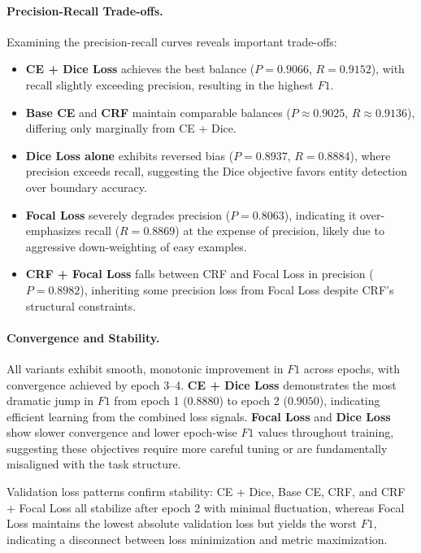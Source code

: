 \paragraph{Precision-Recall Trade-offs.}
Examining the precision-recall curves reveals important trade-offs:

\begin{itemize}
\item \textbf{CE + Dice Loss} achieves the best balance ($P = 0.9066$, $R = 0.9152$), with recall slightly exceeding precision, resulting in the highest $F1$.
\item \textbf{Base CE} and \textbf{CRF} maintain comparable balances ($P \approx 0.9025$, $R \approx 0.9136$), differing only marginally from CE + Dice.
\item \textbf{Dice Loss alone} exhibits reversed bias ($P = 0.8937$, $R = 0.8884$), where precision exceeds recall, suggesting the Dice objective favors entity detection over boundary accuracy.
\item \textbf{Focal Loss} severely degrades precision ($P = 0.8063$), indicating it over-emphasizes recall ($R = 0.8869$) at the expense of precision, likely due to aggressive down-weighting of easy examples.
\item \textbf{CRF + Focal Loss} falls between CRF and Focal Loss in precision ($P = 0.8982$), inheriting some precision loss from Focal Loss despite CRF's structural constraints.
\end{itemize}

\paragraph{Convergence and Stability.}
All variants exhibit smooth, monotonic improvement in $F1$ across epochs, with convergence achieved by epoch 3--4.
\textbf{CE + Dice Loss} demonstrates the most dramatic jump in $F1$ from epoch 1 ($0.8880$) to epoch 2 ($0.9050$), indicating efficient learning from the combined loss signals.
\textbf{Focal Loss} and \textbf{Dice Loss} show slower convergence and lower epoch-wise $F1$ values throughout training, suggesting these objectives require more careful tuning or are fundamentally misaligned with the task structure.

Validation loss patterns confirm stability: CE + Dice, Base CE, CRF, and CRF + Focal Loss all stabilize after epoch 2 with minimal fluctuation, whereas Focal Loss maintains the lowest absolute validation loss but yields the worst $F1$, indicating a disconnect between loss minimization and metric maximization.

